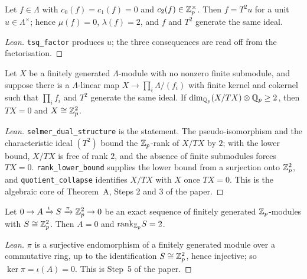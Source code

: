 \begin{lemma}
  \label{lem:TSquaredUnit}
  \leanok
  Let $f \in \Lambda$ with $c_0(f) = c_1(f) = 0$ and $c_2(f) \in
  \mathbb{Z}_p^\times$. Then $f = T^2 u$ for a unit $u \in \Lambda^\times$; hence
  $\mu(f) = 0$, $\lambda(f) = 2$, and $f$ and $T^2$ generate the same
  ideal.
\end{lemma}
\begin{proof}[Lean]
  \leanok
  \texttt{tsq\_factor} produces $u$; the three consequences are read off
  from the factorisation.
\end{proof}

\begin{lemma}
  \label{lem:SelmerDualStructure}
  \leanok
  Let $X$ be a finitely generated $\Lambda$-module with no nonzero finite
  submodule, and suppose there is a $\Lambda$-linear map
  $X \to \prod_i \Lambda/(f_i)$ with finite kernel and cokernel such that
  $\prod_i f_i$ and $T^2$ generate the same ideal. If
  $\dim_{\mathbb{Q}_p}(X/TX) \otimes \mathbb{Q}_p \ge 2$, then $TX = 0$ and $X \cong \mathbb{Z}_p^2$.
\end{lemma}
\begin{proof}[Lean]
  \leanok
  \texttt{selmer\_dual\_structure} is the statement. The pseudo-isomorphism
  and the characteristic ideal $(T^2)$ bound the $\mathbb{Z}_p$-rank of $X/TX$ by
  $2$; with the lower bound, $X/TX$ is free of rank $2$, and the absence of
  finite submodules forces $TX = 0$. \texttt{rank\_lower\_bound} supplies
  the lower bound from a surjection onto $\mathbb{Z}_p^2$, and
  \texttt{quotient\_collapse} identifies $X/TX$ with $X$ once $TX = 0$.
  This is the algebraic core of Theorem~A, Steps 2 and 3 of the paper.
\end{proof}

\begin{lemma}
  \label{lem:ShaEndgame}
  \leanok
  Let $0 \to A \xrightarrow{\iota} S \xrightarrow{\pi} \mathbb{Z}_p^2 \to 0$ be an
  exact sequence of finitely generated $\mathbb{Z}_p$-modules with $S \cong \mathbb{Z}_p^2$.
  Then $A = 0$ and $\mathrm{rank}_{\mathbb{Z}_p} S = 2$.
\end{lemma}
\begin{proof}[Lean]
  \leanok
  $\pi$ is a surjective endomorphism of a finitely generated module over a
  commutative ring, up to the identification $S \cong \mathbb{Z}_p^2$, hence
  injective; so $\ker \pi = \iota(A) = 0$. This is Step~5 of the paper.
\end{proof}

